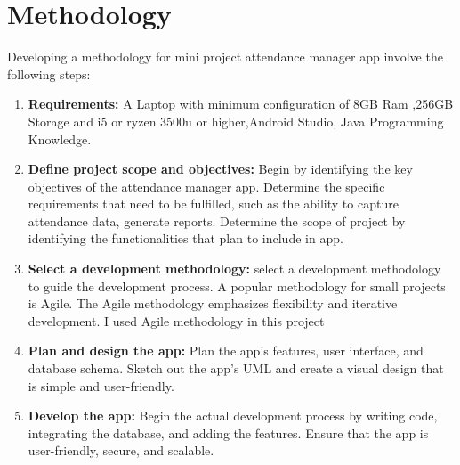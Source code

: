 \documentclass{article}
\begin{document}
\section{Methodology}
{\fontsize{14}{14}\selectfont
Developing a methodology for  mini project attendance manager app  involve the following steps:
\begin{enumerate}

   \item \textbf{Requirements:} A Laptop with minimum configuration of 8GB Ram ,256GB Storage and i5 or ryzen 3500u or higher,Android Studio, Java Programming Knowledge.

\item \textbf{Define project scope and objectives:} Begin by identifying the key objectives of the attendance manager app. Determine the specific requirements that need to be fulfilled, such as the ability to capture attendance data, generate reports. Determine the scope of project by identifying the functionalities that plan to include in  app.

 \item \textbf{Select a development methodology:}  select a development methodology to guide the development process. A popular methodology for small projects is Agile. The Agile methodology emphasizes flexibility and iterative development. I used Agile methodology in this project

 \item \textbf{Plan and design the app:} Plan the app's features, user interface, and database schema. Sketch out the app's UML and create a visual design that is simple and user-friendly.

 \item \textbf{Develop the app:} Begin the actual development process by writing code, integrating the database, and adding the features. Ensure that the app is user-friendly, secure, and scalable. 
 
 
\end{enumerate}}
\newpage
\end{document}
